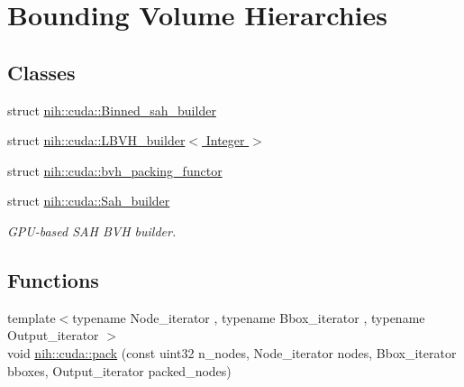 \hypertarget{group__bvh}{
\section{\-Bounding \-Volume \-Hierarchies}
\label{group__bvh}
}
\subsection*{\-Classes}
\begin{DoxyCompactItemize}
\item 
struct \hyperlink{structnih_1_1cuda_1_1_binned__sah__builder}{nih\-::cuda\-::\-Binned\-\_\-sah\-\_\-builder}
\item 
struct \hyperlink{structnih_1_1cuda_1_1_l_b_v_h__builder}{nih\-::cuda\-::\-L\-B\-V\-H\-\_\-builder$<$ Integer $>$}
\item 
struct \hyperlink{structnih_1_1cuda_1_1bvh__packing__functor}{nih\-::cuda\-::bvh\-\_\-packing\-\_\-functor}
\item 
struct \hyperlink{structnih_1_1cuda_1_1_sah__builder}{nih\-::cuda\-::\-Sah\-\_\-builder}
\begin{DoxyCompactList}\small\item\em \-G\-P\-U-\/based \-S\-A\-H \-B\-V\-H builder. \end{DoxyCompactList}\end{DoxyCompactItemize}
\subsection*{\-Functions}
\begin{DoxyCompactItemize}
\item 
{\footnotesize template$<$typename Node\-\_\-iterator , typename Bbox\-\_\-iterator , typename Output\-\_\-iterator $>$ }\\void \hyperlink{group__bvh_ga6e090f607737d9e380e3f2cc04bca282}{nih\-::cuda\-::pack} (const uint32 n\-\_\-nodes, \-Node\-\_\-iterator nodes, \-Bbox\-\_\-iterator bboxes, \-Output\-\_\-iterator packed\-\_\-nodes)
\end{DoxyCompactItemize}


